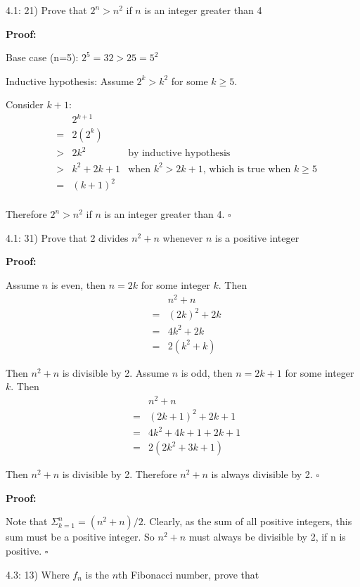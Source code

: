 \documentclass{article}
\newenvironment{proof}
{\color{PineGreen}\begin{list}{}%
         {\setlength{\leftmargin}{1cm}}%
         \item[]%
        \textbf{Proof:}
        
        }
{ $\square$\end{list}}
\begin{document}
4.1: 21) Prove that $2^n > n^2$ if $n$ is an integer greater than 4

\begin{proof}
Base case (n=5):
$2^5 = 32 > 25 = 5^2$

Inductive hypothesis:
Assume $2^k > k^2$ for some $k \geq 5$.

Consider $k+1$:
\[\begin{array}{rclr}
&& 2^{k+1}& \\
&=& 2(2^k) & \\
&>& 2k^2 & \textrm{by inductive hypothesis} \\
&>& k^2 + 2k + 1 & \textrm{when }k^2>2k+1\textrm{, which is true when }k \geq 5 \\
&=& (k+1)^2 &\\
\end{array}\]

Therefore $2^n > n^2$ if $n$ is an integer greater than 4.\end{proof}

4.1: 31) Prove that 2 divides $n^2 + n$ whenever $n$ is a positive integer

\begin{proof} Assume $n$ is even, then $n = 2k$ for some integer $k$. Then 
\[\begin{array}{rcl}
&&n^2 + n \\
&=& (2k)^2 + 2k \\
&=& 4k^2 + 2k \\
&=& 2(k^2 + k)
\end{array}\]

Then $n^2 + n$ is divisible by 2. Assume $n$ is odd, then $n = 2k+1$ for some integer $k$. Then 
\[\begin{array}{rcl}
&&n^2 + n \\
&=& (2k+1)^2 + 2k+1\\
&=& 4k^2 +4k + 1 + 2k + 1 \\
&=& 2(2k^2 + 3k + 1)
\end{array}\]

Then $n^2 + n$ is divisible by 2. Therefore $n^2 + n$ is always divisible by 2.\end{proof}

\begin{proof}Note that $\Sigma^n_{k=1} = (n^2+n)/2$. Clearly, as the sum of all positive integers, 
this sum must be a positive integer. So $n^2+n$ must always be divisible by 2, if n is positive.\end{proof}

4.3: 13) Where $f_n$ is the $n$th Fibonacci number, prove that
\end{document}
